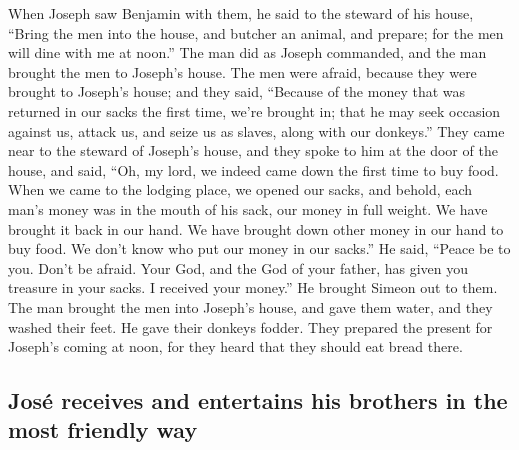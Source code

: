  When Joseph saw Benjamin with them, he said to the
steward of his house, ``Bring the men into the house, and butcher an
animal, and prepare; for the men will dine with me at noon.''
 The man did as Joseph commanded, and the man brought the
men to Joseph's house.  The men were afraid, because they
were brought to Joseph's house; and they said, ``Because of the money
that was returned in our sacks the first time, we're brought in; that he
may seek occasion against us, attack us, and seize us as slaves, along
with our donkeys.''  They came near to the steward of
Joseph's house, and they spoke to him at the door of the house,
 and said, ``Oh, my lord, we indeed came down the first
time to buy food.  When we came to the lodging place, we
opened our sacks, and behold, each man's money was in the mouth of his
sack, our money in full weight. We have brought it back in our hand.
 We have brought down other money in our hand to buy
food. We don't know who put our money in our sacks.''  He
said, ``Peace be to you. Don't be afraid. Your God, and the God of your
father, has given you treasure in your sacks. I received your money.''
He brought Simeon out to them.  The man brought the men
into Joseph's house, and gave them water, and they washed their feet. He
gave their donkeys fodder.  They prepared the present for
Joseph's coming at noon, for they heard that they should eat bread
there.

\hypertarget{josuxe9-receives-and-entertains-his-brothers-in-the-most-friendly-way}{%
\subsection{José receives and entertains his brothers in the most
friendly
way}\label{josuxe9-receives-and-entertains-his-brothers-in-the-most-friendly-way}}

